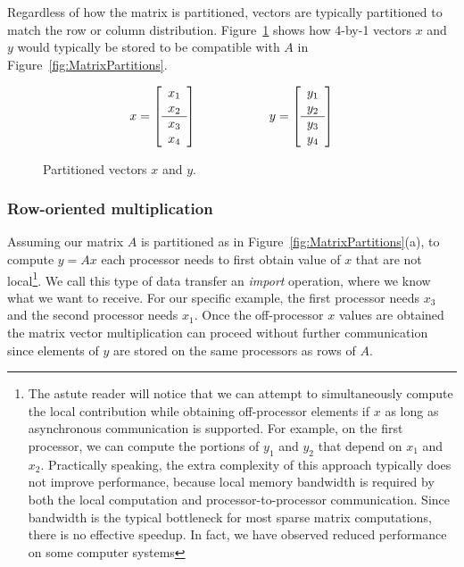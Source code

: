 \documentclass[10pt,relax]{PetraObjectModel}
\begin{document}
Regardless of how the matrix is partitioned, vectors are typically
partitioned to match the row or column distribution.
Figure~\ref{fig:VectorPartitions} shows how 4-by-1 vectors $x$ and $y$
would typically be stored to be compatible with $A$ in
Figure~\ref{fig:MatrixPartitions}.
\begin{figure}
\begin{center}
\begin{equation}
x=\left[
\begin{array}{l}
x_{1}\\
x_{2}\\\hline
x_{3}\\
x_{4}\\
\end{array}
\right]
\hspace{.8in}
y=\left[
\begin{array}{l}
y_{1}\\
y_{2}\\\hline
y_{3}\\
y_{4}\\
\end{array}
\right]
\end{equation}
\end{center}
\caption{\label{fig:VectorPartitions} Partitioned vectors $x$ and $y$.}
\end{figure}

\subsubsection{Row-oriented multiplication}
Assuming our matrix $A$ is partitioned as in
Figure~\ref{fig:MatrixPartitions}(a), to compute $y=Ax$ each
processor needs to first obtain value of $x$ that are not
local\footnote{The astute reader will notice that we can attempt to
simultaneously compute the local contribution while obtaining
off-processor elements if $x$ as long as asynchronous communication
is supported.  For example, on the first processor, we can compute
the portions of $y_1$ and $y_2$ that depend on $x_1$ and $x_2$.
Practically speaking, the extra complexity of this approach
typically does not improve performance, because local memory
bandwidth is required by both the local computation and
processor-to-processor communication. Since bandwidth is the typical
bottleneck for most sparse matrix computations, there is no
effective speedup.  In fact, we have observed reduced performance on
some computer systems}. We call this type of data transfer an {\it
import} operation, where we know what we want to receive. For our
specific example, the first processor needs $x_3$ and the second
processor needs $x_1$. Once the off-processor $x$ values are
obtained the matrix vector multiplication can proceed without
further communication since elements of $y$ are stored on the same
processors as rows of $A$.
\end{document}
